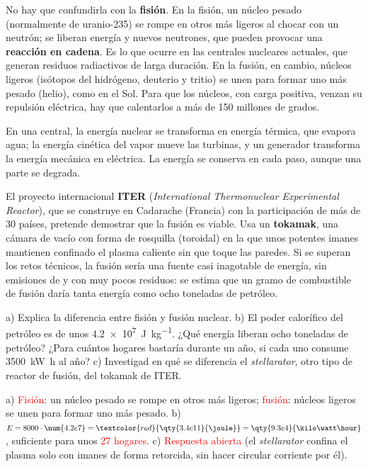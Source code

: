 No hay que confundirla con la \textbf{fisión}. En la fisión, un núcleo pesado (normalmente de uranio-235) se rompe en otros más ligeros
al chocar con un neutrón; se liberan energía y nuevos neutrones, que pueden provocar una \textbf{reacción en cadena}. Es lo que ocurre en
las centrales nucleares actuales, que generan residuos radiactivos de larga duración. En la fusión, en cambio, núcleos ligeros (isótopos
del hidrógeno, deuterio y tritio) se unen para formar uno más pesado (helio), como en el Sol. Para que los núcleos, con carga positiva,
venzan su repulsión eléctrica, hay que calentarlos a más de 150 millones de grados.

En una central, la energía nuclear se transforma en energía térmica, que evapora agua; la energía cinética del vapor mueve las
turbinas, y un generador transforma la energía mecánica en eléctrica. La energía se conserva en cada paso, aunque una parte se degrada.

El proyecto internacional \textbf{ITER} (\textit{International Thermonuclear Experimental Reactor}), que se construye en Cadarache
(Francia) con la participación de más de 30 países, pretende demostrar que la fusión es viable. Usa un \textbf{tokamak}, una cámara de
vacío con forma de rosquilla (toroidal) en la que unos potentes imanes mantienen confinado el plasma caliente sin que toque las paredes.
Si se superan los retos técnicos, la fusión sería una fuente casi inagotable de energía, sin emisiones de  y con muy pocos
residuos: se estima que un gramo de combustible de fusión daría tanta energía como ocho toneladas de petróleo.

\begin{exercise}
    a) Explica la diferencia entre fisión y fusión nuclear. b) El poder calorífico del petróleo es de unos \qty{4.2e7}{\joule\per\kg}.
    ¿Qué energía liberan ocho toneladas de petróleo? ¿Para cuántos hogares bastaría durante un año, si cada uno consume
    \qty{3500}{\kilo\watt\hour} al año? c) Investigad en qué se diferencia el \textit{stellarator}, otro tipo de reactor de fusión, del
    tokamak de ITER.
    \begin{solu}
        a) \textcolor{red}{Fisión}: un núcleo pesado se rompe en otros más ligeros; \textcolor{red}{fusión}: núcleos ligeros se unen
        para formar uno más pesado. b) \(E = 8000 \cdot \num{4.2e7} = \textcolor{red}{\qty{3.4e11}{\joule}} = \qty{9.3e4}{\kilo\watt\hour}\),
        suficiente para unos \textcolor{red}{27 hogares}. c) \textcolor{red}{Respuesta abierta} (el \textit{stellarator} confina el
        plasma solo con imanes de forma retorcida, sin hacer circular corriente por él).
    \end{solu}
\end{exercise}

